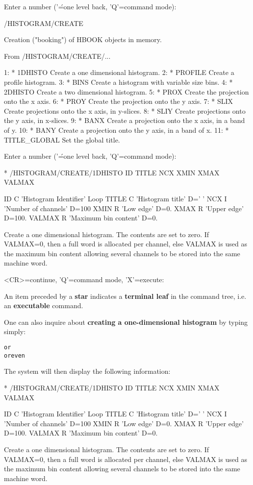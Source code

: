 \begin{falltt}
Enter a number ('\'=one level back, 'Q'=command mode):  

   /HISTOGRAM/CREATE

   Creation ("booking") of HBOOK objects in memory.


From  /HISTOGRAM/CREATE/...

 1: * 1DHISTO       Create a one dimensional histogram.
 2: * PROFILE       Create a profile histogram.
 3: * BINS          Create a histogram with variable size bins.
 4: * 2DHISTO       Create a two dimensional histogram.
 5: * PROX          Create the projection onto the x axis.
 6: * PROY          Create the projection onto the y axis.
 7: * SLIX          Create projections onto the x axis, in y-slices.
 8: * SLIY          Create projections onto the y axis, in x-slices.
 9: * BANX          Create a projection onto the x axis, in a band of y.
10: * BANY          Create a projection onto the y axis, in a band of x.
11: * TITLE_GLOBAL  Set the global title.

Enter a number ('\'=one level back, 'Q'=command mode): 
 
 * /HISTOGRAM/CREATE/1DHISTO  ID TITLE NCX XMIN XMAX \lsb  VALMAX \rsb
 
   ID         C 'Histogram Identifier' Loop
   TITLE      C 'Histogram title' D=' '
   NCX        I 'Number of channels' D=100
   XMIN       R 'Low edge' D=0.
   XMAX       R 'Upper edge' D=100.
   VALMAX     R 'Maximum bin content' D=0.

   Create a one dimensional histogram.  The contents are set to zero.  If
   VALMAX=0, then a full word is allocated per channel, else VALMAX is used
   as the maximum bin content allowing several channels to be stored into
   the same machine word.

<CR>=continue, 'Q'=command mode, 'X'=execute: 
\end{falltt}
An item preceded by a {\bf star} indicates
a {\bf terminal leaf} in the command tree,
i.e. an {\bf executable} command.
 
One can also inquire about {\bf creating a one-dimensional histogram}
by typing simply:
\begin{alltt}
{\rm or}
{\rm or even}
\end{alltt}
The system will then display the following information:
\begin{falltt}
  * /HISTOGRAM/CREATE/1DHISTO  ID TITLE NCX XMIN XMAX \lsb  VALMAX \rsb
 
   ID         C 'Histogram Identifier' Loop
   TITLE      C 'Histogram title' D=' '
   NCX        I 'Number of channels' D=100
   XMIN       R 'Low edge' D=0.
   XMAX       R 'Upper edge' D=100.
   VALMAX     R 'Maximum bin content' D=0.

   Create a one dimensional histogram.  The contents are set to zero.  If
   VALMAX=0, then a full word is allocated per channel, else VALMAX is used
   as the maximum bin content allowing several channels to be stored into
   the same machine word.
\end{falltt}

